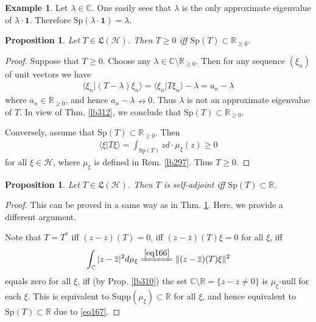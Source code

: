 \documentclass[12pt,b5paper,notitlepage]{article}
\theoremstyle{definition}
\newtheorem{eg}[df]{Example}
\theoremstyle{plain}
\newtheorem{pp}[df]{Proposition}
\newcommand{\fk}{\mathfrak}
\newcommand{\ovl}{\overline}
\newcommand{\idt}{\mathbf{1}}
\newcommand{\bk}[1]{\langle {#1}\rangle}
\newcommand{\Cbb}{\mathbb C}
\newcommand{\Rbb}{\mathbb R}
\newcommand{\Sp}{\mathrm{Sp}}
\newcommand{\Supp}{\mathrm{Supp}}
\newcommand{\MH}{\mathcal H}
\numberwithin{equation}{section}
\begin{document}
\begin{eg}
Let $\lambda\in\Cbb$. One easily sees that $\lambda$ is the only approximate eigenvalue of $\lambda\cdot \idt$. Therefore $\Sp(\lambda\cdot\idt)=\lambda$.
\end{eg}

\begin{pp}\label{lb313}
Let $T\in\fk L(\MH)$. Then $T\geq0$ iff $\Sp(T)\subset\Rbb_{\geq0}$.
\end{pp}

\begin{proof}
Suppose that $T\geq0$. Choose any $\lambda\in\Cbb\setminus\Rbb_{\geq0}$. Then for any sequence $(\xi_n)$ of unit vectors we have
\begin{align*}
\bk{\xi_n|(T-\lambda)\xi_n}=\bk{\xi_n|T\xi_n}-\lambda=a_n-\lambda
\end{align*}
where $a_n\in\Rbb_{\geq0}$, and hence $a_n-\lambda\nrightarrow0$. Thus $\lambda$ is not an approximate eigenvalue of $T$. In view of Thm. \ref{lb312}, we conclude that $\Sp(T)\subset\Rbb_{\geq0}$.

Conversely, assume that $\Sp(T)\subset\Rbb_{\geq0}$. Then
\begin{align*}
\bk{\xi|T\xi}=\int_{\Sp(T)}z d\cdot\mu_\xi(z)\geq0
\end{align*}
for all $\xi\in\MH$, where $\mu_\xi$ is defined in Rem. \ref{lb297}. Thus $T\geq0$. 
\end{proof}





\begin{pp}\label{lb440}
Let $T\in\fk L(\MH)$. Then $T$ is self-adjoint iff $\Sp(T)\subset\Rbb$.
\end{pp}

\begin{proof}
This can be proved in a same way as in Thm. \ref{lb313}. Here, we provide a different argument.

Note that $T=T^*$ iff $(z-\ovl z)(T)=0$, iff $(z-\ovl z)(T)\xi=0$ for all $\xi$, iff
\begin{align*}
\int_\Cbb |z-\ovl z|^2d\mu_\xi\xlongequal{\eqref{eq166}}\Vert(z-\ovl z)(T)\xi\Vert^2
\end{align*}
equals zero for all $\xi$, iff (by Prop. \ref{lb310}) the set $\Cbb\setminus\Rbb=\{z-\ovl z\neq0\}$ is $\mu_\xi$-null for each $\xi$. This is equivalent to $\Supp(\mu_\xi)\subset\Rbb$ for all $\xi$, and hence equivalent to $\Sp(T)\subset\Rbb$ due to \eqref{eq167}.
\end{proof}
\end{document}
